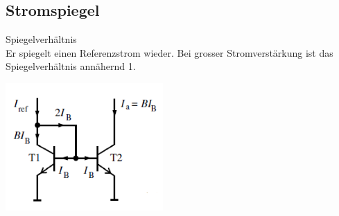   \subsection{Stromspiegel}
    \begin{minipage}{9cm}
      Spiegelverhältnis  \\
      Er spiegelt einen Referenzstrom wieder. Bei grosser Stromverstärkung ist das
      Spiegelverhältnis annähernd 1.
    \end{minipage}
    \begin{minipage}{9cm}
      \includegraphics[width=6cm]{./bilder/Stromspiegel.png}
    \end{minipage}

